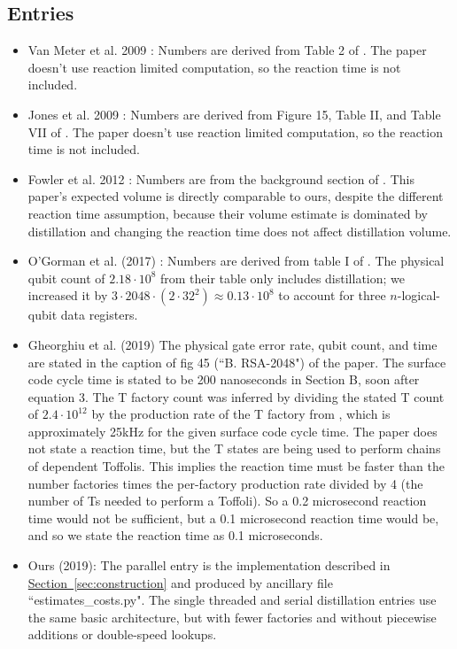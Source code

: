 \documentclass[superscriptaddress,notitlepage,longbibliography]{revtex4-1}
\theoremstyle{definition}
\theoremstyle{definition}
\renewcommand{\sec}[1]{\hyperref[sec:#1]{Section~\ref*{sec:#1}}}
\begin{document}
\subsection{Entries}

\begin{itemize}
    \item Van Meter et al. 2009 \cite{van2010distributed}:
        Numbers are derived from Table 2 of \cite{van2010distributed}.
        The paper doesn't use reaction limited computation, so the reaction time is not included.
    \item Jones et al. 2009 \cite{jones2012layered}:
        Numbers are derived from Figure 15, Table II, and Table VII of \cite{jones2012layered}.
        The paper doesn't use reaction limited computation, so the reaction time is not included.
    \item Fowler et al. 2012 \cite{fowler2012surfacecodereview}:
        Numbers are from the background section of \cite{fowler2012surfacecodereview}.
        This paper's expected volume is directly comparable to ours, despite the different reaction time assumption, because their volume estimate is dominated by distillation and changing the reaction time does not affect distillation volume.
    \item O'Gorman et al. (2017) \cite{ogorman2017factories}:
        Numbers are derived from table I of \cite{ogorman2017factories}.
        The physical qubit count of $2.18 \cdot 10^8$ from their table only includes distillation; we increased it by $3 \cdot 2048 \cdot (2 \cdot 32^2) \approx 0.13 \cdot 10^8$ to account for three $n$-logical-qubit data registers.
    \item Gheorghiu et al. (2019) \cite{gheorghiu2019cryptanalysis}
        The physical gate error rate, qubit count, and time are stated in the caption of fig 45 (``B. RSA-2048") of the paper.
        The surface code cycle time is stated to be 200 nanoseconds in Section B, soon after equation 3.
        The T factory count was inferred by dividing the stated T count of $2.4 \cdot 10^{12}$ by the production rate of the T factory from \cite{fowler2018}, which is approximately 25kHz for the given surface code cycle time.
        The paper does not state a reaction time, but the T states are being used to perform chains of dependent Toffolis.
        This implies the reaction time must be faster than the number factories times the per-factory production rate divided by 4 (the number of Ts needed to perform a Toffoli).
        So a 0.2 microsecond reaction time would not be sufficient, but a 0.1 microsecond reaction time would be, and so we state the reaction time as 0.1 microseconds.
        \\
    \item Ours (2019):
        The parallel entry is the implementation described in \sec{construction} and produced by ancillary file ``estimates\_costs.py".
        The single threaded and serial distillation entries use the same basic architecture, but with fewer factories and without piecewise additions or double-speed lookups.
\end{itemize}
\end{document}
